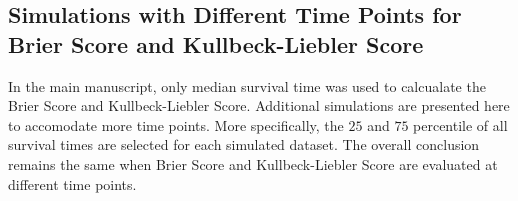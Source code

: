 \documentclass{article}
\begin{document}
\begin{landscape}

\section{Simulations with Different Time Points for Brier Score and Kullbeck-Liebler Score}

In the main manuscript, only median survival time was used to calcualate the Brier Score and Kullbeck-Liebler Score. Additional simulations are presented here to accomodate more time points. More specifically, the $25$ and $75$ percentile of all survival times are selected for each simulated dataset. The overall conclusion remains the same when Brier Score and Kullbeck-Liebler Score are evaluated at different time points.

\begin{table}[ht]

\setlength{\tabcolsep}{3pt}


\end{table}
\end{landscape}
\end{document}
